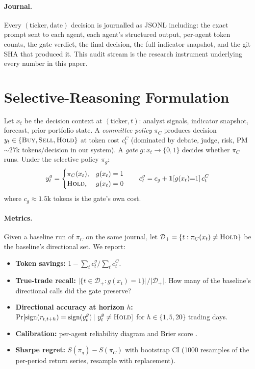 \documentclass[11pt,a4paper]{article}
\begin{document}
\paragraph{Journal.}
Every $(\text{ticker}, \text{date})$ decision is journalled as JSONL
including: the exact prompt sent to each agent, each agent's structured
output, per-agent token counts, the gate verdict, the final decision,
the full indicator snapshot, and the git SHA that produced it. This
audit stream is the research instrument underlying every number in
this paper.

\section{Selective-Reasoning Formulation}
\label{sec:formulation}

Let $x_t$ be the decision context at $(\text{ticker}, t)$: analyst
signals, indicator snapshot, forecast, prior portfolio state. A
\emph{committee policy} $\pi_C$ produces decision $y_t \in
\{\textsc{Buy}, \textsc{Sell}, \textsc{Hold}\}$ at token cost $c_t^C$
(dominated by debate, judge, risk, PM $\sim$27k tokens/decision in our
system). A \emph{gate} $g : x_t \to \{0,1\}$ decides whether $\pi_C$
runs. Under the selective policy $\pi_g$:
\begin{equation}
  y_t^g =
  \begin{cases}
    \pi_C(x_t), & g(x_t) = 1 \\
    \textsc{Hold}, & g(x_t) = 0
  \end{cases}
  \qquad
  c_t^g = c_g + \mathbf{1}[g(x_t){=}1]\, c_t^C
\end{equation}
where $c_g \approx 1.5$k tokens is the gate's own cost.

\paragraph{Metrics.}
Given a baseline run of $\pi_C$ on the same journal,
let $\mathcal{D}_{+} = \{t : \pi_C(x_t) \ne \textsc{Hold}\}$ be the
baseline's directional set. We report:

\begin{itemize}\itemsep1pt
  \item \textbf{Token savings:} $1 - \sum_t c_t^g / \sum_t c_t^C$.
  \item \textbf{True-trade recall:}
    $\lvert\{t \in \mathcal{D}_{+} : g(x_t){=}1\}\rvert / \lvert\mathcal{D}_{+}\rvert$.
    How many of the baseline's directional calls did the gate preserve?
  \item \textbf{Directional accuracy at horizon $h$:}
    $\Pr[\mathrm{sign}(r_{t,t+h}) = \mathrm{sign}(y_t^g) \mid y_t^g \ne \textsc{Hold}]$
    for $h \in \{1, 5, 20\}$ trading days.
  \item \textbf{Calibration:} per-agent reliability diagram
    \citep{niculescu2005predicting} and Brier score \citep{brier1950}.
  \item \textbf{Sharpe regret:}
    $S(\pi_g) - S(\pi_C)$ with bootstrap CI (1000 resamples of the
    per-period return series, resample with replacement).
\end{itemize}
\end{document}
